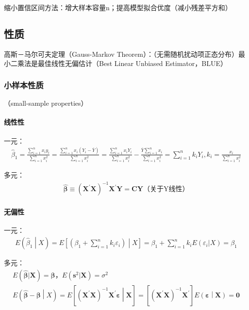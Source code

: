 \documentclass[12pt]{book}
\begin{document}
缩小置信区间方法：增大样本容量n；提高模型拟合优度（减小残差平方和）

\subsection{性质}

高斯－马尔可夫定理（Gauss-Markov Theorem）：（无需随机扰动项正态分布）最小二乘法是最佳线性无偏估计（Best Linear Unbiased Estimator，BLUE）

\subsubsection{小样本性质}

（small-sample properties）


\paragraph{线性性}

一元：
\begin{gather*}
    {\hat{\beta}}_1=\frac{\sum_{i=1}^{n}{x_iy_i}}{\sum_{i=1}^{n}x_i^2}=\frac{\sum_{i=1}^{n}{x_i\left(Y_i-\overline{Y}\right)}}{\sum_{i=1}^{n}x_i^2}=\frac{\sum_{i=1}^{n}{x_iY_i}}{\sum_{i=1}^{n}x_i^2}-\frac{\overline{Y}\sum_{i=1}^{n}x_i}{\sum_{i=1}^{n}x_i^2}=\sum_{i=1}^{n}{k_iY_i}, k_i=\frac{x_i}{\sum_{i=1}^{n}{x_i^2}}
\end{gather*}

多元：
\begin{gather*}
    \hat{\bm{\beta}}\equiv\left(\mathbf{X}^\prime\mathbf{X}\right)^{-1}\mathbf{X}^\prime\mathbf{Y}=\mathbf{CY}\text{（关于Y线性）}
\end{gather*}


\paragraph{无偏性}

一元：
\begin{gather*}
    E\left({\hat{\beta}}_1\middle| X\right)=E\left[\left(\beta_1+\sum_{i=1}^{n}{k_i\varepsilon_i}\right)\middle| X\right]=\beta_1+\sum_{i=1}^{n}{k_iE(\varepsilon_i|X)}=\beta_1
\end{gather*}


多元：
\begin{gather*}
    E(\hat{\bm{\beta}}|\bm{X}) =\bm{\beta}，E(\bm{s}^2|\bm{X})=\sigma^2\\
    E\left(\hat{\bm{\beta}}-\bm{\beta}\middle| X\right) =E\left[\left(\bm{X}^\prime\bm{X}\right)^{-1}\bm{X}^\prime\bm{\varepsilon}\middle|\bm{X}\right] =\left[\left(\bm{X}^\prime\bm{X}\right)^{-1}\bm{X}^\prime\right]E\left(\bm{\varepsilon}\middle|\bm{X}\right)=\bm{0}
\end{gather*}
\end{document}
